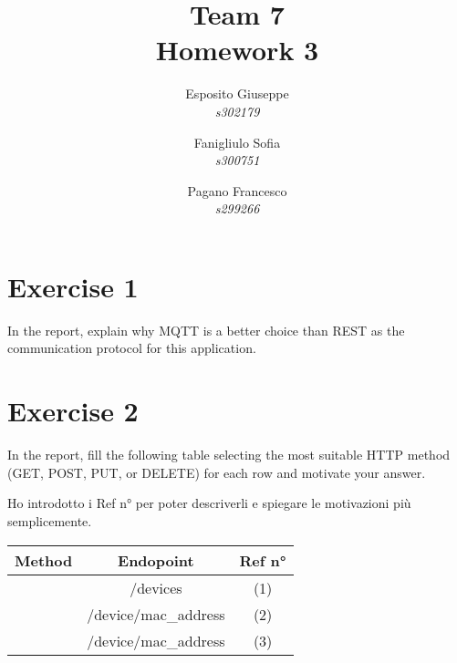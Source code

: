 \documentclass{article}
\title{\huge{Team 7 \\ Homework 3}}
\author{
Esposito Giuseppe\\
\textit{s302179}
\and
Fanigliulo Sofia\\
\textit{s300751}
\and
Pagano Francesco\\
\textit{s299266}}
\date{}
\begin{document}
\maketitle

\section{Exercise 1}

In the report, explain why MQTT is a better choice than REST as the communication protocol for
this application.

\section{Exercise 2}

In the report, fill the following table selecting the most suitable HTTP method (GET, POST, PUT, or DELETE) for each row and motivate your answer.

Ho introdotto i Ref n° per poter descriverli e spiegare le motivazioni più semplicemente.

\medskip

\begin{centering}
\begin{tabular}{|c|c|c|}
\hline
\textbf{Method} & \textbf{Endopoint} & \textbf{Ref n°}\\
\hline
	& /devices & (1)	\\
\hline
	& /device/{mac\_address} &	(2)\\
\hline
	& /device/{mac\_address} & 	(3)\\
\hline
\end{tabular}
\end{centering}
\end{document}
